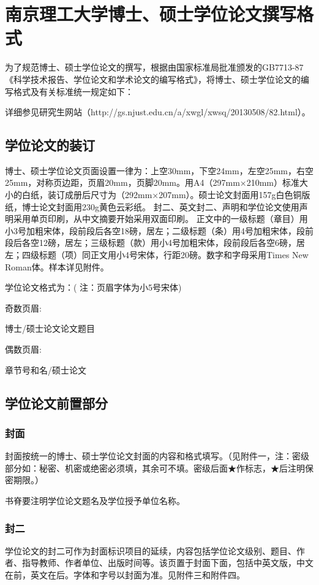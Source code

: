 \chapter{南京理工大学博士、硕士学位论文撰写格式}
\label{app:format}
为了规范博士、硕士学位论文的撰写，根据由国家标准局批准颁发的GB7713-87《科学技术报告、学位论文和学术论文的编写格式》，将博士、硕士学位论文的编写格式及有关标准统一规定如下：

详细参见研究生网站（http://gs.njust.edu.cn/a/xwgl/xwsq/20130508/82.html）。

\section{学位论文的装订}

博士、硕士学位论文页面设置一律为：上空30mm，下空24mm，左空25mm，右空25mm，对称页边距，页眉20mm，页脚20mm。用A4（297mm×210mm）标准大小的白纸，装订成册后尺寸为（292mm×207mm）。硕士论文封面用157g白色铜版纸，博士论文封面用230g黄色云彩纸。
封二、英文封二、声明和学位论文使用声明采用单页印刷，从中文摘要开始采用双面印刷。
正文中的一级标题（章目）用小3号加粗宋体，段前段后各空18磅，居左；二级标题（条）用4号加粗宋体，段前段后各空12磅，居左；三级标题（款）用小4号加粗宋体，段前段后各空6磅，居左；四级标题（项）同正文用小4号宋体，行距20磅。数字和字母采用Times New Roman体。样本详见附件。

学位论文格式为：( 注：页眉字体为小5号宋体)

奇数页眉:

博士/硕士论文\hspace{40pt}论文题目

偶数页眉:

章节号和名\hspace{40pt}/硕士论文


\section{学位论文前置部分}
\subsection{封面}
封面按统一的博士、硕士学位论文封面的内容和格式填写。（见附件一，注：密级部分如：秘密、机密或绝密必须填，其余可不填。密级后面★作标志，★后注明保密期限。）

书脊要注明学位论文题名及学位授予单位名称。

\subsection{封二}
学位论文的封二可作为封面标识项目的延续，内容包括学位论文级别、题目、作者、指导教师、作者单位、出版时间等。该页置于封面下面，包括中英文版，中文在前，英文在后。字体和字号以封面为准。见附件三和附件四。

